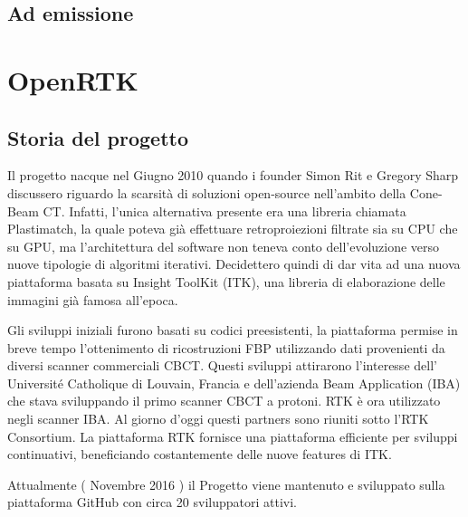 \documentclass[a4paper,12pt, doubleside]{report}
\begin{document}
            \subsection{Ad emissione}
        
        
        \section{OpenRTK}
            \subsection{Storia del progetto}
                \par 
                    Il progetto nacque nel Giugno 2010 quando i founder Simon Rit e Gregory Sharp discussero riguardo la scarsità di soluzioni open-source nell'ambito della Cone-Beam CT. Infatti, l'unica alternativa presente era una libreria chiamata Plastimatch, la quale poteva già effettuare retroproiezioni filtrate sia su CPU che su GPU, ma l'architettura del software non teneva conto dell'evoluzione verso nuove tipologie di algoritmi iterativi. Decidettero quindi di dar vita ad una nuova piattaforma basata su Insight ToolKit (ITK), una libreria di elaborazione delle immagini già famosa all'epoca.
                \par
                    Gli sviluppi iniziali furono basati su codici preesistenti, la piattaforma permise in breve tempo l'ottenimento di ricostruzioni FBP utilizzando dati provenienti da diversi scanner commerciali CBCT. Questi sviluppi attirarono l'interesse dell' Université Catholique di Louvain, Francia e dell'azienda Beam Application (IBA) che stava sviluppando il primo scanner CBCT a protoni. RTK è ora utilizzato negli scanner IBA. Al giorno d'oggi questi partners sono riuniti sotto l'RTK Consortium. La piattaforma RTK fornisce una piattaforma efficiente per sviluppi continuativi, beneficiando costantemente delle nuove features di ITK.
                \par
                
                    Attualmente ( Novembre 2016 ) il Progetto viene mantenuto e sviluppato sulla piattaforma GitHub con circa 20 sviluppatori attivi.
                
                
\end{document}
